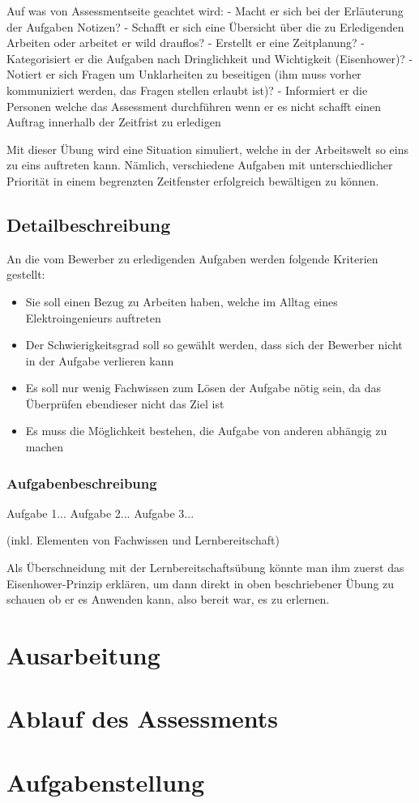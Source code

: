 Auf was von Assessmentseite geachtet wird:
- Macht er sich bei der Erläuterung der Aufgaben Notizen?
- Schafft er sich eine Übersicht über die zu Erledigenden Arbeiten oder arbeitet er wild drauflos?
- Erstellt er eine Zeitplanung?
- Kategorisiert er die Aufgaben nach Dringlichkeit und Wichtigkeit (Eisenhower)?
- Notiert er sich Fragen um Unklarheiten zu beseitigen (ihm muss vorher kommuniziert werden, das Fragen stellen erlaubt ist)?
- Informiert er die Personen welche das Assessment durchführen wenn er es nicht schafft einen Auftrag innerhalb der Zeitfrist zu erledigen

Mit dieser Übung wird eine Situation simuliert, welche in der Arbeitswelt so eins zu eins auftreten kann. Nämlich, verschiedene Aufgaben mit unterschiedlicher Priorität in einem begrenzten Zeitfenster erfolgreich bewältigen zu können.

\subsection{Detailbeschreibung}

An die vom Bewerber zu erledigenden Aufgaben werden folgende Kriterien gestellt:

\begin{itemize}
\item Sie soll einen Bezug zu Arbeiten haben, welche im Alltag eines Elektroingenieurs auftreten
\item Der Schwierigkeitsgrad soll so gewählt werden, dass sich der Bewerber nicht in der Aufgabe verlieren kann \item Es soll nur wenig Fachwissen zum Lösen der Aufgabe nötig sein, da das Überprüfen ebendieser nicht das Ziel ist
\item Es muss die Möglichkeit bestehen, die Aufgabe von anderen abhängig zu machen
\end{itemize}

\subsubsection{Aufgabenbeschreibung}

Aufgabe 1...
Aufgabe 2...
Aufgabe 3...

(inkl. Elementen von Fachwissen und Lernbereitschaft)

Als Überschneidung mit der Lernbereitschaftsübung könnte man ihm zuerst das Eisenhower-Prinzip erklären, um dann direkt in oben beschriebener Übung zu schauen ob er es Anwenden kann, also bereit war, es zu erlernen. 

\section{Ausarbeitung}

\section{Ablauf des Assessments}

\section{Aufgabenstellung}